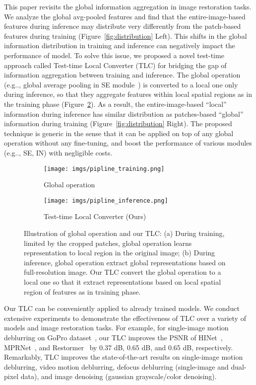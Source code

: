 \documentclass[runningheads]{llncs}
\makeatletter
\DeclareRobustCommand\onedot{\futurelet\@let@token\@onedot}
\def\@onedot{\ifx\@let@token.\else.\null\fi\xspace}
\def\eg{e.g\onedot}
\makeatother
\begin{document}
This paper revisits the global information aggregation in image restoration tasks. We analyze the global avg-pooled features and find that the entire-image-based features during inference may distribute very differently from the patch-based features during training (Figure~\ref{fig:distribution} Left). This shifts in the global information distribution in training and inference can negatively impact the performance of model.
To solve this issue, we proposed a novel test-time approach called Test-time Local Converter (TLC) for bridging the gap of information aggregation between training and inference. 
The global operation (\eg, global average pooling in SE module~\cite{hu2018squeeze}) is converted to a local one only during inference, so that they aggregate features within local spatial regions as in the training phase (Figure~\ref{fig:pipline_b}). As a result, the entire-image-based ``local'' information during inference has similar distribution as patches-based ``global'' information during training (Figure~\ref{fig:distribution} Right).
The proposed technique is generic in the sense that it can be applied on top of any global operation without any fine-tuning, and boost the performance of various modules (\eg, SE, IN) with negligible costs.


\begin{figure}[t]
     \centering
     \begin{subfigure}[b]{0.36\textwidth}
         \centering
         \texttt{[image: imgs/pipline\_training.png]}
         \caption{Global operation}
         \label{fig:pipline_a}
     \end{subfigure}
     \hfill
     \begin{subfigure}[b]{0.61\textwidth}
         \centering
         \texttt{[image: imgs/pipline\_inference.png]}
         \caption{Test-time Local Converter (Ours)}
         \label{fig:pipline_b}
     \end{subfigure}
        \caption{{Illustration of global operation and our TLC}: (a) During training, limited by the cropped patches, global operation learns representation to local region in the original image; (b) During inference, global operation extract global representations based on full-resolution image. Our TLC convert the global operation to a local one so that it extract representations based on local spatial region of features as in training phase.}
        \label{fig:pipline}
\end{figure} Our TLC can be conveniently applied to already trained models.
We conduct extensive experiments to demonstrate the effectiveness of TLC over a variety of models and image restoration tasks. 
For example, for single-image motion deblurring on GoPro dataset~\cite{nah2017deep},
our TLC improves the PSNR of HINet~\cite{chen2021hinet}, MPRNet~\cite{Zamir2021MPRNet}, and Restormer~\cite{zamir2021restormer} by 0.37 dB, 0.65 dB, and 0.65 dB, respectively. 
Remarkably, TLC improves the state-of-the-art results on single-image motion deblurring, video motion deblurring, defocus deblurring (single-image and dual-pixel data), and image denoising (gaussian grayscale/color denoising).
\end{document}

